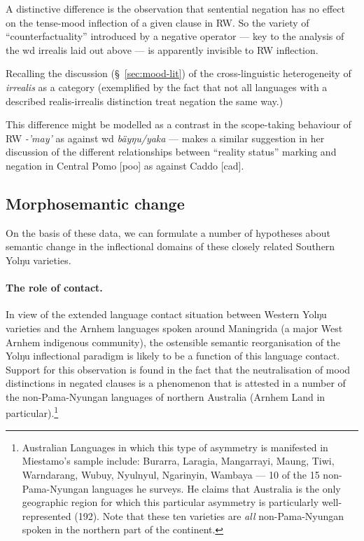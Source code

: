 A distinctive difference is the observation that sentential negation has no effect on the tense-mood inflection of a given clause in RW. So the variety of ``counterfactuality'' introduced by a negative operator --- key to the analysis of the \gls{wd} irrealis laid out above --- is apparently invisible to RW inflection.

Recalling the discussion (\S~\ref{sec:mood-lit}) of the cross-linguistic heterogeneity of \textit{irrealis} as a category (exemplified by the fact that not all languages with a described realis-irrealis distinction treat negation the same way.)

This difference might be modelled as a contrast in the scope-taking behaviour of RW \textit{-'may'} as against \gls{wd} \textit{bäyŋu/yaka} --- \citet[]{Mithun1995} makes a similar suggestion in her discussion of the different relationships between ``reality status'' marking and negation in Central Pomo [\gls{poo}] as against Caddo [\gls{cad}].


\subsection{Morphosemantic change}

On the basis of these data, we can formulate a number of hypotheses about semantic change in the inflectional domains of these closely related Southern Yolŋu varieties.

\paragraph*{The role of contact.} In view of the extended language contact situation between Western Yolŋu varieties and the Arnhem languages spoken around Maningrida (a major West Arnhem indigenous community), the ostensible semantic reorganisation of the Yolŋu inflectional paradigm is likely to be a function of this language contact. Support for this observation is found in the fact that the neutralisation of mood distinctions in negated clauses is a phenomenon that is attested in a number of the non-Pama-Nyungan languages of northern Australia (Arnhem Land in particular).\footnote{Australian Languages in which this type of asymmetry is manifested  in Miestamo's \citeyearpar[411]{Miestamo2005} sample include: Burarra, Laragia, Mangarrayi, Maung, Tiwi, Warndarang, Wubuy, Nyulnyul, Ngarinyin, Wambaya --- 10 of the 15 non-Pama-Nyungan languages he surveys. He claims that Australia is the only geographic region for which this particular asymmetry is particularly well-represented (192). Note that these ten varieties are \textit{all}  non-Pama-Nyungan spoken in the northern part of the continent.} 

